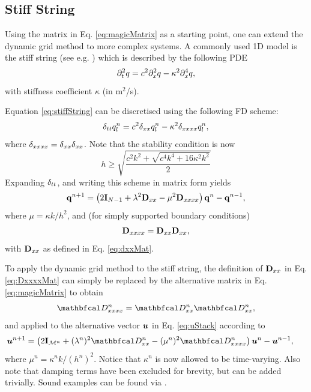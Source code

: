 \documentclass[fleqn]{jaes}
\begin{document}
\subsection{Stiff String}\label{sec:stiffString}
Using the matrix in Eq. \eqref{eq:magicMatrix} as a starting point, one can extend the dynamic grid method to more complex systems. A commonly used 1D model is the stiff string (see e.g. \cite{Webb2015, Bilbao2019, Willemsen2019}) which is described by the following PDE \cite{Bilbao2009}
\begin{equation}\label{eq:stiffString}
    \ptt q = c^2 \pxx q - \kappa^2 \pxxxx q,
\end{equation} 
with stiffness coefficient $\kappa$ (in m$^2$/s).

Equation \eqref{eq:stiffString} can be discretised using the following FD scheme:
\begin{equation}
    \delta_{tt} q_l^n = c^2 \delta_{xx} q_l^n - \kappa^2 \delta_{xxxx} q_l^n,
\end{equation}
where $\delta_{xxxx} = \delta_{xx}\delta_{xx}$. Note that the stability condition is now
\begin{equation}
    h \geq \sqrt{\frac{c^2k^2 + \sqrt{c^4k^4+16\kappa^2k^2}}{2}}
\end{equation} 
Expanding $\delta_{tt}$, and writing this scheme in matrix form yields
\begin{equation}\label{eq:stiffStringDynMatrix}
    \q^{n+1} = \left(2\I_{N-1} + \lambda^2 \Dxx - \mu^2 \Dxxxx\right)\q^{n} - \q^{n-1},
\end{equation}
where $\mu = \kappa k/h^2$, and (for simply supported boundary conditions)
\begin{equation}\label{eq:DxxxxMat}
    \Dxxxx = \Dxx\Dxx,
\end{equation}
with $\mathbf{D}_{xx}$ as defined in Eq. \eqref{eq:dxxMat}.

To apply the dynamic grid method to the stiff string, the definition of $\mathbf{D}_{xx}$ in Eq. \eqref{eq:DxxxxMat} can simply be replaced by the alternative matrix in Eq. \eqref{eq:magicMatrix} to obtain
\begin{equation}
    \DDxxxx = \DDxx\DDxx,
\end{equation}
and applied to the alternative vector $\boldsymbol{u}$ in Eq. \eqref{eq:uStack} according to
\begin{equation}
    \!\!\!\!\!\!\!\!\!\uStack^{n+1} = \left(2\I_\MoneD + (\lambda^n)^2\DDxx - (\mu^n)^2\DDxxxx\right)\uStack^n - \uStack^{n-1},
\end{equation}
where $\mu^n = \kappa^n k/(h^n)^2$. Notice that $\kappa^n$ is now allowed to be time-varying. Also note that damping terms have been excluded for brevity, but can be added trivially. Sound examples can be found via \cite{soundExamples}.
\end{document}
